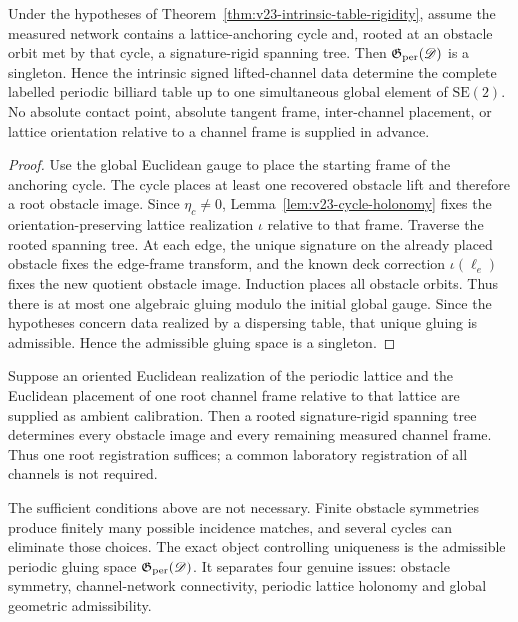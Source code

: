 \begin{corollary}
\label{cor:v23-signature-rigid-global}
Under the hypotheses of Theorem~\ref{thm:v23-intrinsic-table-rigidity}, assume
the measured network contains a lattice-anchoring cycle and, rooted at an
obstacle orbit met by that cycle, a signature-rigid spanning tree.  Then
\(\mathfrak G_{\rm per}(\mathscr D)\) is a singleton.  Hence the intrinsic
signed lifted-channel data determine the complete labelled periodic billiard
table up to one simultaneous global element of \(\mathrm{SE}(2)\).  No
absolute contact point, absolute tangent frame, inter-channel placement, or
lattice orientation relative to a channel frame is supplied in advance.
\end{corollary}

\begin{proof}
Use the global Euclidean gauge to place the starting frame of the anchoring
cycle.  The cycle places at least one recovered obstacle lift and therefore a
root obstacle image.  Since \(\eta_c\ne0\),
Lemma~\ref{lem:v23-cycle-holonomy} fixes the orientation-preserving lattice
realization \(\iota\) relative to that frame.  Traverse the rooted spanning
tree.  At each edge, the unique signature on the already placed obstacle fixes
the edge-frame transform, and the known deck correction
\(\iota(\ell_e)\) fixes the new quotient obstacle image.  Induction places all
obstacle orbits.  Thus there is at most one algebraic gluing modulo the initial
global gauge.  Since the hypotheses concern data realized by a dispersing
table, that unique gluing is admissible.  Hence the admissible gluing space is
a singleton.
\end{proof}

\begin{corollary}
\label{cor:v23-known-lattice-frame}
Suppose an oriented Euclidean realization of the periodic lattice and the
Euclidean placement of one root channel frame relative to that lattice are
supplied as ambient calibration.  Then a rooted signature-rigid spanning tree
determines every obstacle image and every remaining measured channel frame.
Thus one root registration suffices; a common laboratory registration of all
channels is not required.
\end{corollary}

\begin{remark}
\label{rem:v23-generic-holonomy}
The sufficient conditions above are not necessary.  Finite obstacle symmetries
produce finitely many possible incidence matches, and several cycles can
eliminate those choices.  The exact object controlling uniqueness is the
admissible periodic gluing space \(\mathfrak G_{\rm per}(\mathscr D)\).  It
separates four genuine issues: obstacle symmetry, channel-network connectivity,
periodic lattice holonomy and global geometric admissibility.
\end{remark}

